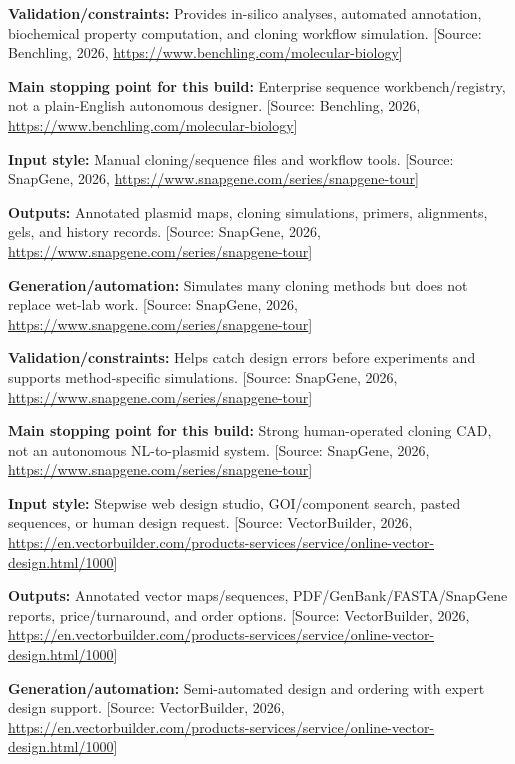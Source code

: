 \documentclass[11pt]{report}
\begin{document}
\begin{description}
\textbf{Validation/constraints:} Provides in-silico analyses, automated annotation, biochemical property computation, and cloning workflow simulation. [Source: Benchling, 2026, \url{https://www.benchling.com/molecular-biology}]\par
\textbf{Main stopping point for this build:} Enterprise sequence workbench/registry, not a plain-English autonomous designer. [Source: Benchling, 2026, \url{https://www.benchling.com/molecular-biology}]\par
\item[SnapGene]
\textbf{Input style:} Manual cloning/sequence files and workflow tools. [Source: SnapGene, 2026, \url{https://www.snapgene.com/series/snapgene-tour}]\par
\textbf{Outputs:} Annotated plasmid maps, cloning simulations, primers, alignments, gels, and history records. [Source: SnapGene, 2026, \url{https://www.snapgene.com/series/snapgene-tour}]\par
\textbf{Generation/automation:} Simulates many cloning methods but does not replace wet-lab work. [Source: SnapGene, 2026, \url{https://www.snapgene.com/series/snapgene-tour}]\par
\textbf{Validation/constraints:} Helps catch design errors before experiments and supports method-specific simulations. [Source: SnapGene, 2026, \url{https://www.snapgene.com/series/snapgene-tour}]\par
\textbf{Main stopping point for this build:} Strong human-operated cloning CAD, not an autonomous NL-to-plasmid system. [Source: SnapGene, 2026, \url{https://www.snapgene.com/series/snapgene-tour}]\par
\item[VectorBuilder]
\textbf{Input style:} Stepwise web design studio, GOI/component search, pasted sequences, or human design request. [Source: VectorBuilder, 2026, \url{https://en.vectorbuilder.com/products-services/service/online-vector-design.html/1000}]\par
\textbf{Outputs:} Annotated vector maps/sequences, PDF/GenBank/FASTA/SnapGene reports, price/turnaround, and order options. [Source: VectorBuilder, 2026, \url{https://en.vectorbuilder.com/products-services/service/online-vector-design.html/1000}]\par
\textbf{Generation/automation:} Semi-automated design and ordering with expert design support. [Source: VectorBuilder, 2026, \url{https://en.vectorbuilder.com/products-services/service/online-vector-design.html/1000}]\par

\end{description}
\end{document}
